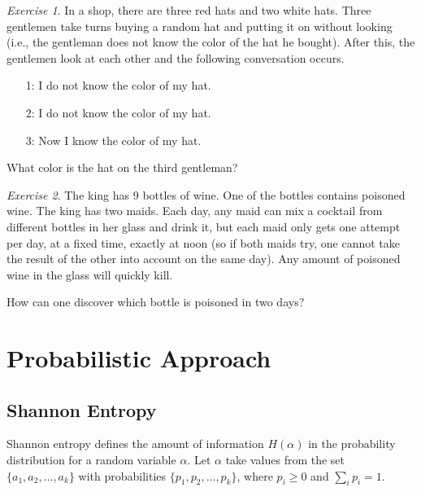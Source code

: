 \documentclass[12pt,sans]{article}
\newcommand{\seqn}[2]{{#1}_1,{#1}_2,\dotsc,{#1}_{#2}}
\theoremstyle{definition}
\theoremstyle{plain}
\theoremstyle{remark}
\newtheorem{exercise}{Exercise}[section]
\begin{document}
\begin{exercise}
    In a shop, there are three red hats and two white hats. Three gentlemen take turns buying a random hat and putting it on without looking
    (i.e., the gentleman does not know the color of the hat he bought). After this, the gentlemen look at each other and the following conversation occurs.
    \begin{itemize}
        \item[1:] I do not know the color of my hat.
        \item[2:] I do not know the color of my hat.
        \item[3:] Now I know the color of my hat.
    \end{itemize}
    What color is the hat on the third gentleman?
\end{exercise}

\begin{exercise}
    The king has 9 bottles of wine. One of the bottles contains poisoned wine.
    The king has two maids. Each day, any maid can mix a cocktail from different bottles in her glass and drink it, but each maid only gets one attempt per day, at a fixed time, exactly at noon (so if both maids try, one cannot take the result of the other into account on the same day). Any amount of poisoned wine in the glass will quickly kill.

    How can one discover which bottle is poisoned in two days?
\end{exercise}

\section{Probabilistic Approach}
\subsection{Shannon Entropy}

Shannon entropy defines the amount of information \(H(\alpha)\) in the probability distribution for a random variable \(\alpha\). Let \(\alpha\) take values from the set \(\{\seqn{a}{k}\}\) with probabilities \(\{\seqn{p}{k}\}\), where \(p_i \ge 0\) and \(\sum_i p_i = 1\).
\end{document}
